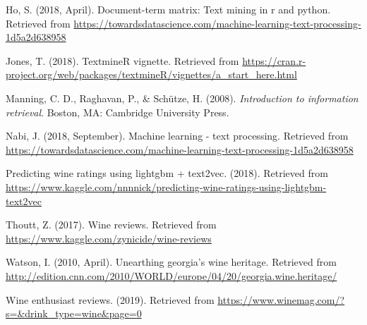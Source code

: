 \documentclass[12pt,twoside]{amherstthesis}
\begin{document}
\hypertarget{refs}{}
\hypertarget{ref-ho2018}{}
Ho, S. (2018, April). Document-term matrix: Text mining in r and python.
Retrieved from
\url{https://towardsdatascience.com/machine-learning-text-processing-1d5a2d638958}

\hypertarget{ref-jones2019}{}
Jones, T. (2018). TextmineR vignette. Retrieved from
\url{https://cran.r-project.org/web/packages/textmineR/vignettes/a_start_here.html}

\hypertarget{ref-manning2008}{}
Manning, C. D., Raghavan, P., \& Schütze, H. (2008). \emph{Introduction
to information retrieval}. Boston, MA: Cambridge University Press.

\hypertarget{ref-textprocess}{}
Nabi, J. (2018, September). Machine learning - text processing.
Retrieved from
\url{https://towardsdatascience.com/machine-learning-text-processing-1d5a2d638958}

\hypertarget{ref-kagglepredict}{}
Predicting wine ratings using lightgbm + text2vec. (2018). Retrieved
from
\url{https://www.kaggle.com/nnnnick/predicting-wine-ratings-using-lightgbm-text2vec}

\hypertarget{ref-thoutt2017}{}
Thoutt, Z. (2017). Wine reviews. Retrieved from
\url{https://www.kaggle.com/zynicide/wine-reviews}

\hypertarget{ref-watson2010}{}
Watson, I. (2010, April). Unearthing georgia's wine heritage. Retrieved
from
\url{http://edition.cnn.com/2010/WORLD/europe/04/20/georgia.wine.heritage/}

\hypertarget{ref-winemag}{}
Wine enthusiast reviews. (2019). Retrieved from
\url{https://www.winemag.com/?s=\&drink_type=wine\&page=0}


\end{document}
